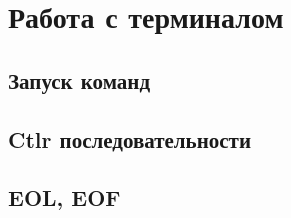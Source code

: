 \section{Работа с терминалом}
\subsection{Запуск команд}
\subsection{Ctlr последовательности}
\subsection{EOL, EOF}



%
\newpage
